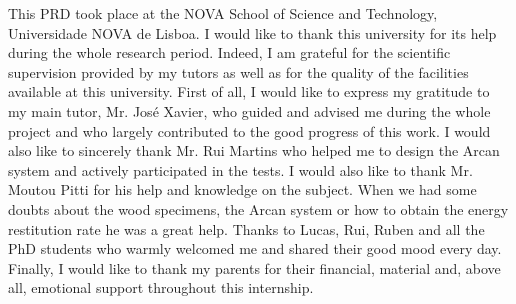 \documentclass[
11pt, %
oneside, %
english, %
singlespacing, %
parskip, %
headsepline, %
chapterinoneline, %
]{MastersDoctoralThesis} %
\begin{document}

\begin{acknowledgements}
\addchaptertocentry{\acknowledgementname} %
\vspace{2cm}
This PRD took place at the NOVA School of Science and Technology, Universidade NOVA de Lisboa. I would like to thank this university for its help during the whole research period. Indeed, I am grateful for the scientific supervision provided by my tutors as well as for the quality of the facilities available at this university.
First of all, I would like to express my gratitude to my main tutor, Mr. José Xavier, who guided and advised me during the whole project and who largely contributed to the good progress of this work. 
I would also like to sincerely thank Mr. Rui Martins who helped me to design the Arcan system and actively participated in the tests.
I would also like to thank Mr. Moutou Pitti for his help and knowledge on the subject. When we had some doubts about the wood specimens, the Arcan system or how to obtain the energy restitution rate he was a great help.
Thanks to Lucas, Rui, Ruben and all the PhD students who warmly welcomed me and shared their good mood every day.
Finally, I would like to thank my parents for their financial, material and, above all, emotional support throughout this internship.

\end{acknowledgements}
\end{document}
